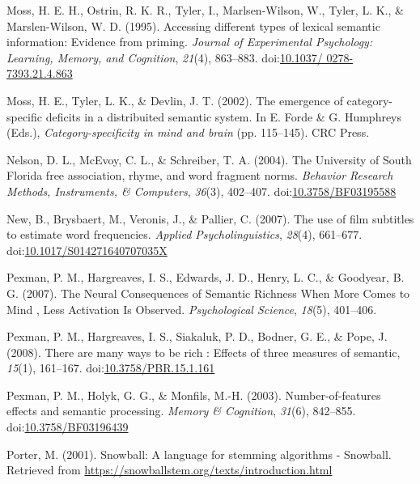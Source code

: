 \documentclass[english,,man]{apa6}
\theoremstyle{definition}
\theoremstyle{definition}
\theoremstyle{definition}
\theoremstyle{remark}
\begin{document}
\leavevmode\hypertarget{ref-Moss1995}{}%
Moss, H. E. H., Ostrin, R. K. R., Tyler, I., Marlsen-Wilson, W., Tyler,
L. K., \& Marslen-Wilson, W. D. (1995). Accessing different types of
lexical semantic information: Evidence from priming. \emph{Journal of
Experimental Psychology: Learning, Memory, and Cognition}, \emph{21}(4),
863--883.
doi:\href{https://doi.org/10.1037/\%200278-7393.21.4.863}{10.1037/ 0278-7393.21.4.863}

\leavevmode\hypertarget{ref-Moss2002}{}%
Moss, H. E., Tyler, L. K., \& Devlin, J. T. (2002). The emergence of
category-specific deficits in a distribuited semantic system. In E.
Forde \& G. Humphreys (Eds.), \emph{Category-specificity in mind and
brain} (pp. 115--145). CRC Press.

\leavevmode\hypertarget{ref-Nelson2004}{}%
Nelson, D. L., McEvoy, C. L., \& Schreiber, T. A. (2004). The University
of South Florida free association, rhyme, and word fragment norms.
\emph{Behavior Research Methods, Instruments, \& Computers},
\emph{36}(3), 402--407.
doi:\href{https://doi.org/10.3758/BF03195588}{10.3758/BF03195588}

\leavevmode\hypertarget{ref-New2007}{}%
New, B., Brysbaert, M., Veronis, J., \& Pallier, C. (2007). The use of
film subtitles to estimate word frequencies. \emph{Applied
Psycholinguistics}, \emph{28}(4), 661--677.
doi:\href{https://doi.org/10.1017/S014271640707035X}{10.1017/S014271640707035X}

\leavevmode\hypertarget{ref-Pexman2007}{}%
Pexman, P. M., Hargreaves, I. S., Edwards, J. D., Henry, L. C., \&
Goodyear, B. G. (2007). The Neural Consequences of Semantic Richness
When More Comes to Mind , Less Activation Is Observed.
\emph{Psychological Science}, \emph{18}(5), 401--406.

\leavevmode\hypertarget{ref-Pexman2008}{}%
Pexman, P. M., Hargreaves, I. S., Siakaluk, P. D., Bodner, G. E., \&
Pope, J. (2008). There are many ways to be rich : Effects of three
measures of semantic, \emph{15}(1), 161--167.
doi:\href{https://doi.org/10.3758/PBR.15.1.161}{10.3758/PBR.15.1.161}

\leavevmode\hypertarget{ref-Pexman2003}{}%
Pexman, P. M., Holyk, G. G., \& Monfils, M.-H. (2003).
Number-of-features effects and semantic processing. \emph{Memory \&
Cognition}, \emph{31}(6), 842--855.
doi:\href{https://doi.org/10.3758/BF03196439}{10.3758/BF03196439}

\leavevmode\hypertarget{ref-Porter2001}{}%
Porter, M. (2001). Snowball: A language for stemming algorithms -
Snowball. Retrieved from
\url{https://snowballstem.org/texts/introduction.html}
\end{document}
